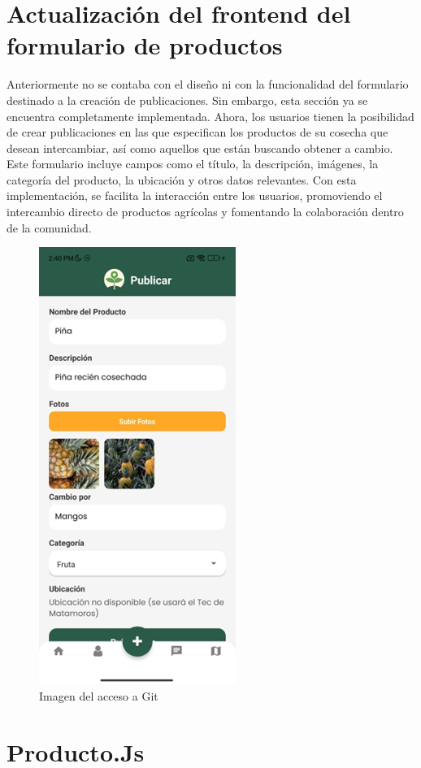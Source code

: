 \documentclass[11pt, a4paper, oneside]{book}
\begin{document}
\newpage
\section{\textbf{Actualización del frontend del formulario de productos}}

Anteriormente no se contaba con el diseño ni con la funcionalidad del formulario destinado a la creación de publicaciones. Sin embargo, esta sección ya se encuentra completamente implementada. Ahora, los usuarios tienen la posibilidad de crear publicaciones en las que especifican los productos de su cosecha que desean intercambiar, así como aquellos que están buscando obtener a cambio. Este formulario incluye campos como el título, la descripción, imágenes, la categoría del producto, la ubicación y otros datos relevantes. Con esta implementación, se facilita la interacción entre los usuarios, promoviendo el intercambio directo de productos agrícolas y fomentando la colaboración dentro de la comunidad.

\begin{figure}[H]
    \centering
    \includegraphics[width=0.40
    \linewidth]{Pictures/Imagen6.png}
        \caption{Imagen del acceso a Git}

\end{figure}

\newpage
\section{Producto.Js}
\end{document}
